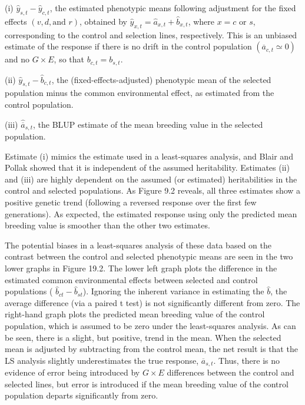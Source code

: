 \documentclass{article}
\begin{document}
(i)  $ \widehat{y}_{s,t} - \widehat{y}_{c,t} $, the estimated phenotypic means following adjustment for the fixed effects  $ (v, d, \text{and } r) $, obtained by  $ \widehat{y}_{x,t} = \widehat{a}_{x,t} + \widehat{b}_{x,t} $, where  $ x = c $ or  $ s $, corresponding to the control and selection lines, respectively. This is an unbiased estimate of the response if there is no drift in the control population  $ (\overline{a}_{c,t} \simeq 0) $ and no  $ G \times E $, so that  $ b_{c,t} = b_{s,t} $.

(ii)  $ \widehat{y}_{s,t} - \widehat{b}_{c,t} $, the (fixed-effects-adjusted) phenotypic mean of the selected population minus the common environmental effect, as estimated from the control population.

(iii)  $ \widehat{\overline{a}}_{s,t} $, the BLUP estimate of the mean breeding value in the selected population.

Estimate (i) mimics the estimate used in a least-squares analysis, and Blair and Pollak showed that it is independent of the assumed heritability. Estimates (ii) and (iii) are highly dependent on the assumed (or estimated) heritabilities in the control and selected populations. As Figure 9.2 reveals, all three estimates show a positive genetic trend (following a reversed response over the first few generations). As expected, the estimated response using only the predicted mean breeding value is smoother than the other two estimates.

The potential biases in a least-squares analysis of these data based on the contrast between the control and selected phenotypic means are seen in the two lower graphs in Figure 19.2. The lower left graph plots the difference in the estimated common environmental effects between selected and control populations ( $ \widehat{b}_{ct} - \widehat{b}_{st} $). Ignoring the inherent variance in estimating the  $ \widehat{b} $, the average difference (via a paired t test) is not significantly different from zero. The right-hand graph plots the predicted mean breeding value of the control population, which is assumed to be zero under the least-squares analysis. As can be seen, there is a slight, but positive, trend in the mean. When the selected mean is adjusted by subtracting from the control mean, the net result is that the LS analysis slightly underestimates the true response,  $ \overline{a}_{s,t} $. Thus, there is no evidence of error being introduced by  $ G \times E $ differences between the control and selected lines, but error is introduced if the mean breeding value of the control population departs significantly from zero.
\end{document}
